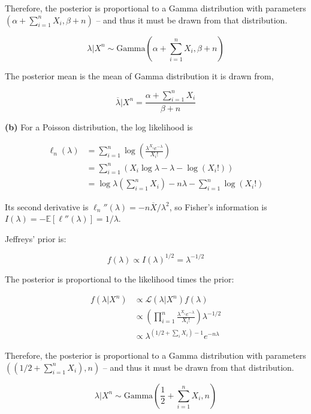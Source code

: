 Therefore, the posterior is proportional to a Gamma distribution with
parameters \(\left(\alpha + \sum_{i=1}^n X_i, \beta + n\right)\) -- and
thus it must be drawn from that distribution.

\[\lambda | X^n \sim \text{Gamma}\left(\alpha + \sum_{i=1}^n X_i, \beta + n \right)\]

The posterior mean is the mean of Gamma distribution it is drawn from,

\[ \overline{\lambda} | X^n = \frac{\alpha + \sum_{i=1}^n X_i}{\beta + n} \]

\textbf{(b)} For a Poisson distribution, the log likelihood is

\begin{align}
\ell_n(\lambda) &= \sum_{i=1}^n \log \left( \frac{\lambda^{X_i} e^{-\lambda}}{X_i!}\right)  \\
&= \sum_{i=1}^n \left( X_i \log \lambda - \lambda - \log (X_i!)\right) \\
&= \log \lambda \left( \sum_{i=1}^n X_i \right) - n\lambda - \sum_{i=1}^n \log (X_i!)
\end{align}

Its second derivative is
\(\ell_n''(\lambda) = -n \overline{X} / \lambda^2\), so Fisher's
information is
\(I(\lambda) = -\mathbb{E}[\ell''(\lambda)] = 1 / \lambda\).

Jeffreys' prior is:

\[f(\lambda) \propto I(\lambda)^{1/2} = \lambda^{-1/2}\]

The posterior is proportional to the likelihood times the prior:

\begin{align}
f(\lambda | X^n) &\propto \mathcal{L}(\lambda | X^n) f(\lambda) \\
&\propto \left(\prod_{i=1}^n \frac{\lambda^{X_i}e^{-\lambda}}{X_i!} \right) \lambda^{-1/2} \\
&\propto \lambda^{\left(1/2 + \sum_i X_i \right) - 1} e^{-n\lambda}
\end{align}

Therefore, the posterior is proportional to a Gamma distribution with
parameters \(\left(\left(1/2 + \sum_{i=1}^n X_i \right), n\right)\) --
and thus it must be drawn from that distribution.

\[\lambda | X^n \sim \text{Gamma}\left(\frac{1}{2} + \sum_{i=1}^n X_i, n \right)\]
